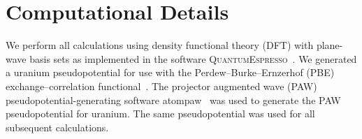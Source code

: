 

\section{Computational Details}\label{sec_comp}
We perform all calculations using density functional theory (DFT) with
plane-wave basis sets as implemented in the software
\textsc{QuantumEspresso}~\cite{giannozzi2009quantum}. We generated a uranium
pseudopotential for use with the Perdew--Burke--Ernzerhof (PBE)
exchange--correlation functional~\cite{Perdew1996b,Perdew1997}.
The projector augmented wave (PAW) pseudopotential-generating software
atompaw~\cite{holzwarth2001projector,tackett2001projector} was used to generate
the PAW pseudopotential for uranium. The same pseudopotential was used for all
subsequent calculations.

